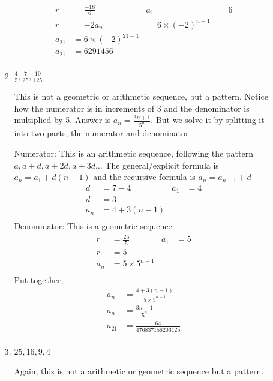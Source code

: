 \documentclass[paper=a4, fontsize=11pt]{scrartcl}
\begin{document}
\begin{enumerate}[resume]
\begin{enumerate}
\begin{enumerate}
            \begin{align*}
                r&=\frac{-18}{6}&a_1&=6\\
                r&=-2
                a_n&=6\times(-2)^{n-1}\\
                a_{21}&=6\times(-2)^{21-1}\\
                a_{21}&=6291456\\
            \end{align*}
            \item $\frac{4}{5},\frac{7}{25},\frac{10}{125}$
            
            This is not a geometric or arithmetic sequence, but a pattern. Notice how the numerator is in increments of 3 and the denominator is multiplied by 5.
            Answer is $a_n=\frac{3n+1}{5^n}$. But we solve it by splitting it into two parts, the numerator and denominator.

            Numerator: This is an arithmetic sequence, following the pattern $a,a+d,a+2d,a+3d\ldots$ The general/explicit formula is $a_n=a_1+d(n-1)$ and the recursive formula is $a_n=a_{n-1}+d$ 
            \begin{align*}
                d&=7-4&a_1&=4\\
                d&=3\\
                a_n&=4+3(n-1)\\
            \end{align*}
            Denominator: This is a geometric sequence
            \begin{align*}
                r&=\frac{25}{5}&a_1&=5\\
                r&=5\\
                a_n&=5\times5^{n-1}\\
            \end{align*}
            Put together,
            \begin{align*}
                a_n&=\frac{4+3(n-1)}{5\times5^{n-1}}\\
                a_n&=\frac{3n+1}{5^n}\\
                a_{21}&=\frac{64}{476837158203125}\\
            \end{align*}
            \item $25,16,9,4$
            
            Again, this is not a arithmetic or geometric sequence but a pattern. 


\end{enumerate}
\end{enumerate}
\end{enumerate}
\end{document}
